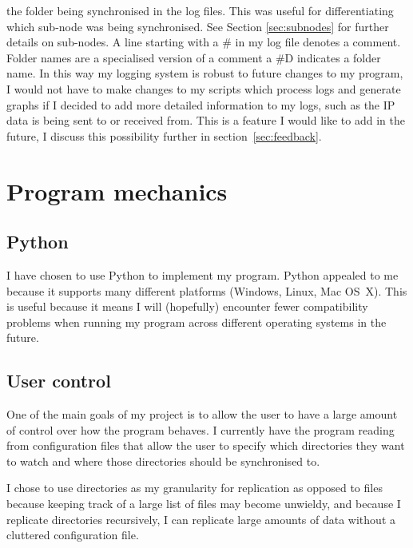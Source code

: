 \documentclass[12pt]{article}
\begin{document}
the folder being synchronised in the log files.
This was useful for differentiating which sub-node
was being synchronised. See Section \ref{sec:subnodes} for
further details on sub-nodes. A line starting with
a \# in my log file denotes a comment. Folder names
are a specialised version of a comment a \#D indicates
a folder name. In this way my logging system is robust
to future changes to my program, I would not have to
make changes to my scripts which process logs and generate graphs
if I decided to add more detailed information to my logs,
such as the IP data is being sent to or received from. This
is a feature I would like to add in the future, I discuss this
possibility further in section~\ref{sec:feedback}.


\section{Program mechanics}

\subsection{Python}
I have chosen to use Python to implement
my program. Python appealed to me because it
supports many different platforms (Windows, Linux, Mac OS~X).
This is useful because it means I will (hopefully)
encounter fewer compatibility problems when running
my program across different operating systems in the future.


\subsection{User control}
One of the main goals of my project is to allow the user
to have a  large amount of control over how the program
behaves. I currently have the program reading from
configuration files that allow the user to specify
which directories they want to watch and where those
directories should be synchronised to.

I chose to use directories as my granularity for replication
as opposed to files because keeping track of a large list
of files may become unwieldy,
and because I replicate
directories recursively, I can replicate large amounts
of data without a cluttered configuration file.
\end{document}
